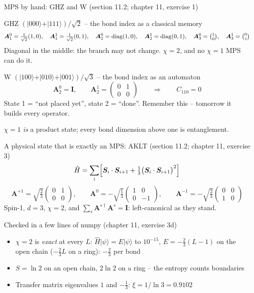 \documentclass[aspectratio=169,10pt]{beamer}
\newcommand{\ket}[1]{\vert #1\rangle}
\newcommand{\bmat}[1]{\bm{#1}}
\newcommand{\Amat}[1]{\bm{A}^{#1}}
\newcommand{\hH}{\hat{H}}
\begin{document}
\begin{frame}{MPS by hand: GHZ and W (section 11.2; chapter 11, exercise 1)}
  \small
  \begin{block}{GHZ $(\ket{000}+\ket{111})/\sqrt2$ -- the bond index as a classical memory}
    \[
      \Amat0_1=\tfrac1{\sqrt2}(1,0),\quad \Amat1_1=\tfrac1{\sqrt2}(0,1),\quad
      \Amat0_2=\mathrm{diag}(1,0),\quad \Amat1_2=\mathrm{diag}(0,1),\quad
      \Amat0_3=\tbinom10,\quad \Amat1_3=\tbinom01
    \]
    Diagonal in the middle: the branch may not change. $\chi=2$, and no $\chi=1$ MPS can do it.
  \end{block}
  \begin{block}{W $(\ket{100}+\ket{010}+\ket{001})/\sqrt3$ -- the bond index as an automaton}
    \[
      \Amat0_2=\bmat I,\qquad \Amat1_2=\begin{pmatrix}0&1\\0&0\end{pmatrix}
      \qquad\Longrightarrow\qquad
      C_{110}=0
    \]
    State 1 = ``not placed yet'', state 2 = ``done''. \alert{Remember this} -- tomorrow it builds every operator.
  \end{block}
  \centering $\chi=1$ \emph{is} a product state; every bond dimension above one is entanglement.
\end{frame}

\begin{frame}{A physical state that is exactly an MPS: AKLT (section 11.2; chapter 11, exercise 3)}
  \small
  \[
    \hH=\sum_i\Bigl[\bm S_i\cdot\bm S_{i+1}+\tfrac13\bigl(\bm S_i\cdot\bm S_{i+1}\bigr)^2\Bigr]
  \]
  \[
    \bmat A^{+1}=\sqrt{\tfrac23}\begin{pmatrix}0&1\\0&0\end{pmatrix},\qquad
    \bmat A^{0}=-\sqrt{\tfrac13}\begin{pmatrix}1&0\\0&-1\end{pmatrix},\qquad
    \bmat A^{-1}=-\sqrt{\tfrac23}\begin{pmatrix}0&0\\1&0\end{pmatrix}
  \]
  Spin-1, $d=3$, $\chi=2$, and $\sum_s\bmat A^{s\dagger}\bmat A^s=\bmat I$: left-canonical as they stand.
  \begin{block}{Checked in a few lines of numpy (chapter 11, exercise 3d)}
    \begin{itemize}
      \item $\chi=2$ is \emph{exact} at every $L$: $\hH\ket\psi=E\ket\psi$ to $10^{-15}$, $E=-\tfrac23(L-1)$ on the open chain ($-\tfrac23L$ on a ring): $-\tfrac23$ per bond
      \item $S=\ln2$ on an open chain, $2\ln2$ on a ring -- \alert{the entropy counts boundaries}
      \item Transfer matrix eigenvalues $1$ and $-\tfrac13$: $\xi=1/\ln3=0.9102$
    \end{itemize}
  \end{block}
\end{frame}
\end{document}
